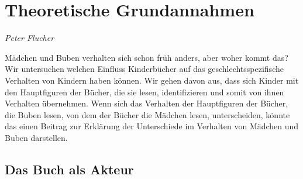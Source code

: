 
\section{Theoretische Grundannahmen}   \emph{Peter Flucher}   \smallskip

  \noindent Mädchen und Buben verhalten sich schon früh anders, aber woher kommt
das? Wir untersuchen welchen Einfluss Kinderbücher auf das
geschlechtsspezifische Verhalten von Kindern haben können. Wir gehen davon aus,
dass sich Kinder mit den Hauptfiguren der Bücher, die sie lesen, identifizieren
und somit von ihnen Verhalten übernehmen.    Wenn sich das Verhalten der
Hauptfiguren der Bücher, die Buben lesen, von dem der Bücher die Mädchen lesen,
unterscheiden, könnte das einen Beitrag zur Erklärung der Unterschiede im
Verhalten von Mädchen und Buben darstellen.

   


  \subsection{Das Buch als Akteur}

